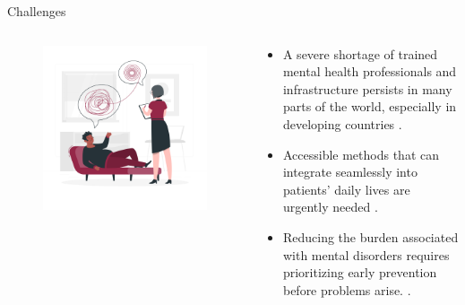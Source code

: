 \documentclass[10pt, xcolor=table]{beamer}
\let\olditem\item
\renewcommand\item{\olditem\justifying}
\begin{document}
\begin{frame}{Challenges}
	
	\begin{columns}
		\begin{column}{0.5\textwidth}
			\begin{figure}[t]
				\centering
				\includegraphics[width=\linewidth]{./figures/psychologist.png}
			\end{figure}
		\end{column}
		
		\begin{column}{0.5\textwidth}
			\begin{itemize}
				\item A severe shortage of trained mental health professionals and infrastructure persists in many parts of the world, especially in developing countries \cite{SHARMA2024e32548}.
				
				\item Accessible methods that can integrate seamlessly into patients’ daily lives are urgently needed \cite{NGUYEN20231458}.
				
				\item Reducing the burden associated with mental disorders requires prioritizing early prevention before problems arise. \cite{GRUMMITT2023200308}.
			\end{itemize}
		\end{column}
	\end{columns}
	
\end{frame}
	
\end{document}
